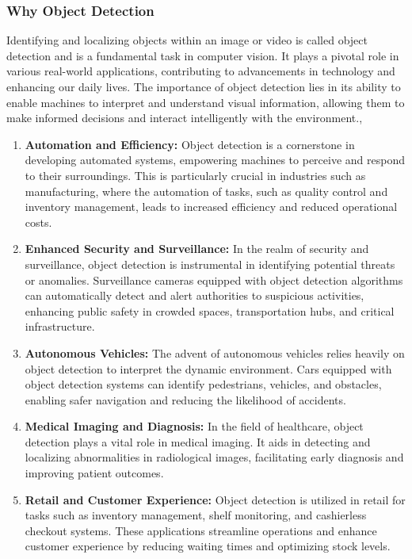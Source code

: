 \subsubsection{Why Object Detection}
Identifying and localizing objects within an image or video is called object detection and is a fundamental task in computer vision. It plays a pivotal role in various real-world applications, contributing to advancements in technology and enhancing our daily lives. The importance of object detection lies in its ability to enable machines to interpret and understand visual information, allowing them to make informed decisions and interact intelligently with the environment.\cite{pathak2018application}, 
\begin{enumerate}
    \item \textbf{Automation and Efficiency:} Object detection is a cornerstone in developing automated systems, empowering machines to perceive and respond to their surroundings. This is particularly crucial in industries such as manufacturing, where the automation of tasks, such as quality control and inventory management, leads to increased efficiency and reduced operational costs.
    \item \textbf{Enhanced Security and Surveillance:}  In the realm of security and surveillance, object detection is instrumental in identifying potential threats or anomalies. Surveillance cameras equipped with object detection algorithms can automatically detect and alert authorities to suspicious activities, enhancing public safety in crowded spaces, transportation hubs, and critical infrastructure.
    \item \textbf{Autonomous Vehicles:} The advent of autonomous vehicles relies heavily on object detection to interpret the dynamic environment. Cars equipped with object detection systems can identify pedestrians, vehicles, and obstacles, enabling safer navigation and reducing the likelihood of accidents.
    \item \textbf{Medical Imaging and Diagnosis:}  In the field of healthcare, object detection plays a vital role in medical imaging. It aids in detecting and localizing abnormalities in radiological images, facilitating early diagnosis and improving patient outcomes.
    \item \textbf{Retail and Customer Experience:} Object detection is utilized in retail for tasks such as inventory management, shelf monitoring, and cashierless checkout systems. These applications streamline operations and enhance customer experience by reducing waiting times and optimizing stock levels.
\end{enumerate}

